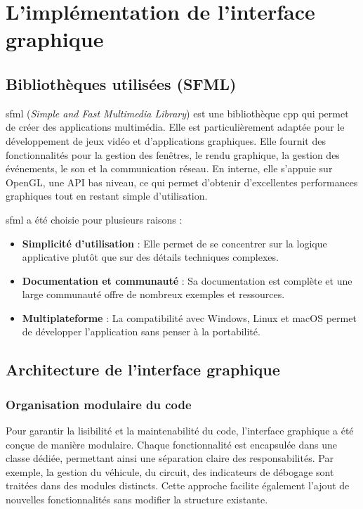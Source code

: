 \section{L'implémentation de l'interface graphique}\label{sec:l'implementation-de-l-interface-graphique}
\subsection{Bibliothèques utilisées (SFML)}\label{subsec:sfml}
\gls{sfml} (\textit{Simple and Fast Multimedia Library}) est une bibliothèque \gls{cpp} qui permet de créer des applications multimédia.
Elle est particulièrement adaptée pour le développement de jeux vidéo et d'applications graphiques.
Elle fournit des fonctionnalités pour la gestion des fenêtres, le rendu graphique, la gestion des événements, le son et la communication réseau.
En interne, elle s'appuie sur OpenGL, une API bas niveau, ce qui permet d'obtenir d'excellentes performances graphiques tout en restant simple d'utilisation.

\gls{sfml} a été choisie pour plusieurs raisons :
\begin{itemize}
    \item \textbf{Simplicité d'utilisation} : Elle permet de se concentrer sur la logique applicative plutôt que sur des détails techniques complexes.
    \item \textbf{Documentation et communauté} : Sa documentation\cite{documentationSFML} est complète et une large communauté offre de nombreux exemples et ressources.
    \item \textbf{Multiplateforme} : La compatibilité avec Windows, Linux et macOS permet de développer l'application sans penser à la portabilité.
\end{itemize}

\subsection{Architecture de l'interface graphique}\label{subsec:architecture-de-l-interface-graphique}
\subsubsection{Organisation modulaire du code}\label{subsubsec:organisation-modulaire-du-code}
Pour garantir la lisibilité et la maintenabilité du code, l'interface graphique a été conçue de manière modulaire.
Chaque fonctionnalité est encapsulée dans une classe dédiée, permettant ainsi une séparation claire des responsabilités.
Par exemple, la gestion du véhicule, du circuit, des indicateurs de débogage sont traitées dans des modules distincts.
Cette approche facilite également l'ajout de nouvelles fonctionnalités sans modifier la structure existante.

